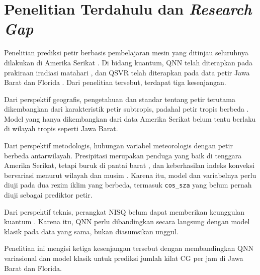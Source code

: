 \section{Penelitian Terdahulu dan \textit{Research Gap}}
Penelitian prediksi petir berbasis pembelajaran mesin yang ditinjau seluruhnya dilakukan di Amerika Serikat \cite{cheng2024MLLP, shanTBDMLI, song2023LNAI, kalashnikov2024PCG, sobash2025MLP}.
Di bidang kuantum, QNN telah diterapkan pada prakiraan iradiasi matahari \cite{oliveira2024QNN}, dan QSVR telah diterapkan pada data petir Jawa Barat dan Florida \cite{fadhil2025}.
Dari penelitian tersebut, terdapat tiga kesenjangan.

Dari perspektif geografis, pengetahuan dan standar tentang petir terutama dikembangkan dari karakteristik petir subtropis, padahal petir tropis berbeda \cite{denov2025RNFPA}.
Model yang hanya dikembangkan dari data Amerika Serikat belum tentu berlaku di wilayah tropis seperti Jawa Barat.

Dari perspektif metodologis, hubungan variabel meteorologis dengan petir berbeda antarwilayah.
Presipitasi merupakan penduga yang baik di tenggara Amerika Serikat, tetapi buruk di pantai barat \cite{cheng2024MLLP}, dan keberhasilan indeks konveksi bervariasi menurut wilayah dan musim \cite{haywardTBD}.
Karena itu, model dan variabelnya perlu diuji pada dua rezim iklim yang berbeda, termasuk \texttt{cos\_sza} yang belum pernah diuji sebagai prediktor petir.

Dari perspektif teknis, perangkat NISQ belum dapat memberikan keunggulan kuantum \cite{oliveira2024QNN}.
Karena itu, QNN perlu dibandingkan secara langsung dengan model klasik pada data yang sama, bukan diasumsikan unggul.

Penelitian ini mengisi ketiga kesenjangan tersebut dengan membandingkan QNN variasional dan model klasik untuk prediksi jumlah kilat CG per jam di Jawa Barat dan Florida.
